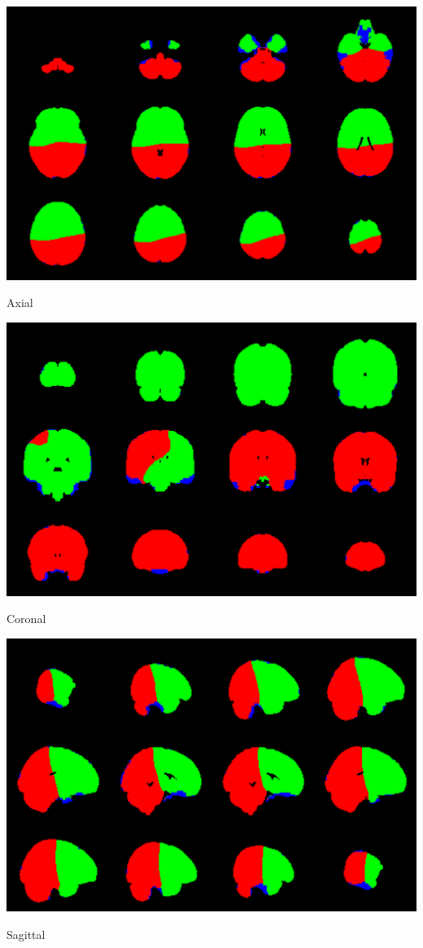 \begin{center}
\includegraphics[scale = 0.5]{figs/5_spectral_2_axial.png}

Axial

\includegraphics[scale = 0.5]{figs/5_spectral_2_coronal.png}

Coronal

\includegraphics[scale = 0.5]{figs/5_spectral_2_sagittal.png}

Sagittal
\end{center}

